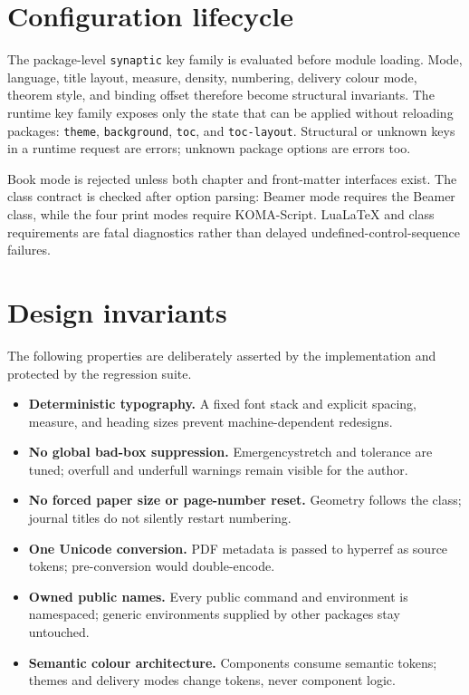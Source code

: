 \documentclass[a4paper,11pt]{scrartcl}
\begin{document}
\section{Configuration lifecycle}

The package-level \texttt{synaptic} key family is evaluated before module
loading. Mode, language, title layout, measure, density, numbering,
delivery colour mode, theorem style, and binding offset therefore become
structural invariants. The runtime key family
exposes only the state that can be applied without reloading packages:
\texttt{theme}, \texttt{background}, \texttt{toc}, and \texttt{toc-layout}.
Structural or unknown keys in a runtime request are errors; unknown package
options are errors too.

Book mode is rejected unless both chapter and front-matter interfaces exist.
The class contract is checked after option parsing: Beamer mode requires the
Beamer class, while the four print modes require KOMA-Script. LuaLaTeX and
class requirements are fatal diagnostics rather than delayed
undefined-control-sequence failures.

\section{Design invariants}

The following properties are deliberately asserted by the implementation and
protected by the regression suite.

\begin{itemize}
  \item \textbf{Deterministic typography.} A fixed font stack and explicit
    spacing, measure, and heading sizes prevent machine-dependent redesigns.
  \item \textbf{No global bad-box suppression.} Emergencystretch and tolerance
    are tuned; overfull and underfull warnings remain visible for the author.
  \item \textbf{No forced paper size or page-number reset.} Geometry follows
    the class; journal titles do not silently restart numbering.
  \item \textbf{One Unicode conversion.} PDF metadata is passed to hyperref as
    source tokens; pre-conversion would double-encode.
  \item \textbf{Owned public names.} Every public command and environment is
    namespaced; generic environments supplied by other packages stay untouched.
  \item \textbf{Semantic colour architecture.} Components consume semantic
    tokens; themes and delivery modes change tokens, never component logic.
\end{itemize}
\end{document}
